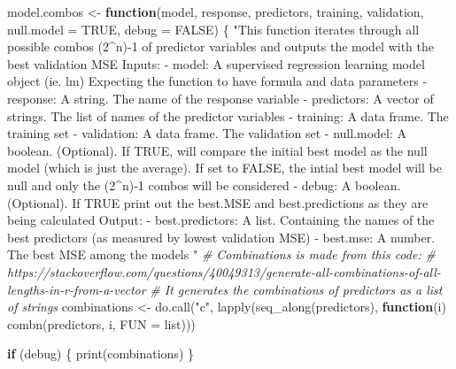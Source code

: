\documentclass[
]{article}
\newenvironment{Shaded}{\begin{snugshade}}{\end{snugshade}}
\newcommand{\AttributeTok}[1]{\textcolor[rgb]{0.77,0.63,0.00}{#1}}
\newcommand{\CommentTok}[1]{\textcolor[rgb]{0.56,0.35,0.01}{\textit{#1}}}
\newcommand{\ConstantTok}[1]{\textcolor[rgb]{0.00,0.00,0.00}{#1}}
\newcommand{\ControlFlowTok}[1]{\textcolor[rgb]{0.13,0.29,0.53}{\textbf{#1}}}
\newcommand{\FunctionTok}[1]{\textcolor[rgb]{0.00,0.00,0.00}{#1}}
\newcommand{\NormalTok}[1]{#1}
\newcommand{\OtherTok}[1]{\textcolor[rgb]{0.56,0.35,0.01}{#1}}
\newcommand{\StringTok}[1]{\textcolor[rgb]{0.31,0.60,0.02}{#1}}
\begin{document}
\begin{Shaded}
\begin{Highlighting}[]
\NormalTok{model.combos }\OtherTok{\textless{}{-}} \ControlFlowTok{function}\NormalTok{(model, }
\NormalTok{                         response, }
\NormalTok{                         predictors, }
\NormalTok{                         training, }
\NormalTok{                         validation, }
                         \AttributeTok{null.model =} \ConstantTok{TRUE}\NormalTok{,}
                         \AttributeTok{debug =} \ConstantTok{FALSE}\NormalTok{) \{}
  \StringTok{"This function iterates through all possible combos (2\^{}n){-}1 of }
\StringTok{    predictor variables and outputs the model with the best validation }
\StringTok{    MSE}
\StringTok{  }
\StringTok{    Inputs:}
\StringTok{      {-} model: A supervised regression learning model object (ie. lm)}
\StringTok{          Expecting the function to have formula and data parameters}
\StringTok{      {-} response: A string. The name of the response variable}
\StringTok{      {-} predictors: A vector of strings. The list of names of the     }
\StringTok{          predictor variables}
\StringTok{      {-} training: A data frame. The training set}
\StringTok{      {-} validation: A data frame. The validation set}
\StringTok{      {-} null.model: A boolean. (Optional). If TRUE, will compare the initial best}
\StringTok{          model as the null model (which is just the average). If set to FALSE,}
\StringTok{          the intial best model will be null and only the (2\^{}n){-}1 combos will be           considered}
\StringTok{      {-} debug: A boolean. (Optional). If TRUE print out the best.MSE and }
\StringTok{          best.predictions as they are being calculated}
\StringTok{      }
\StringTok{    Output:}
\StringTok{      {-} best.predictors: A list. Containing the names of the best }
\StringTok{        predictors (as measured by lowest validation MSE)}
\StringTok{      {-} best.mse: A number. The best MSE among the models}
\StringTok{  "}
  \CommentTok{\# Combinations is made from this code: }
  \CommentTok{\# https://stackoverflow.com/questions/40049313/generate{-}all{-}combinations{-}of{-}all{-}lengths{-}in{-}r{-}from{-}a{-}vector}
  \CommentTok{\# It generates the combinations of predictors as a list of strings}
\NormalTok{  combinations }\OtherTok{\textless{}{-}} \FunctionTok{do.call}\NormalTok{(}\StringTok{"c"}\NormalTok{, }\FunctionTok{lapply}\NormalTok{(}\FunctionTok{seq\_along}\NormalTok{(predictors), }\ControlFlowTok{function}\NormalTok{(i) }\FunctionTok{combn}\NormalTok{(predictors, i, }\AttributeTok{FUN =}\NormalTok{ list)))}
  
  \ControlFlowTok{if}\NormalTok{ (debug) \{}
    \FunctionTok{print}\NormalTok{(combinations)}
\NormalTok{  \}}
  

\end{Highlighting}
\end{Shaded}
\end{document}
